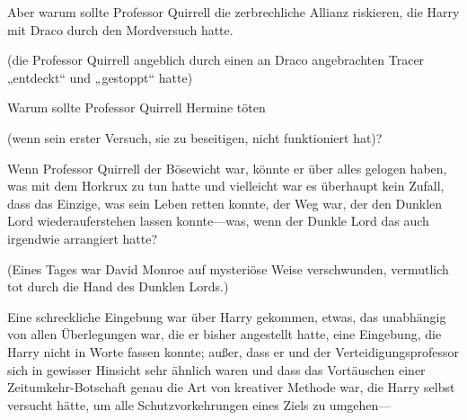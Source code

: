 Aber warum sollte Professor Quirrell die zerbrechliche Allianz riskieren, die Harry mit Draco durch den Mordversuch hatte.

(die Professor Quirrell angeblich durch einen an Draco angebrachten Tracer „entdeckt“ und „gestoppt“ hatte)

Warum sollte Professor Quirrell Hermine töten

(wenn sein erster Versuch, sie zu beseitigen, nicht funktioniert hat)?

Wenn Professor Quirrell der Bösewicht war, könnte er über alles gelogen haben, was mit dem Horkrux zu tun hatte und vielleicht war es überhaupt kein Zufall, dass das Einzige, was sein Leben retten konnte, der Weg war, der den Dunklen Lord wiederauferstehen lassen konnte—was, wenn der Dunkle Lord das auch irgendwie arrangiert hatte?

(Eines Tages war David Monroe auf mysteriöse Weise verschwunden, vermutlich tot durch die Hand des Dunklen Lords.)

Eine schreckliche Eingebung war über Harry gekommen, etwas, das unabhängig von allen Überlegungen war, die er bisher angestellt hatte, eine Eingebung, die Harry nicht in Worte fassen konnte; außer, dass er und der Verteidigungsprofessor sich in gewisser Hinsicht sehr ähnlich waren und dass das Vortäuschen einer Zeitumkehr-Botschaft genau die Art von kreativer Methode war, die Harry selbst versucht hätte, um alle Schutzvorkehrungen eines Ziels zu umgehen—

